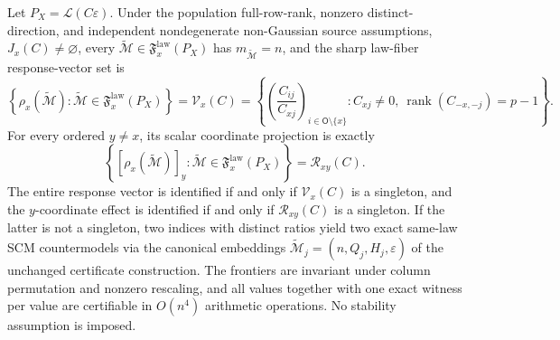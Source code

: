 Let \(P_X=\mathcal L(C\varepsilon)\). Under the population full-row-rank, nonzero distinct-direction, and independent nondegenerate non-Gaussian source assumptions, \(J_x(C)\ne\varnothing\), every \(\widetilde{\mathcal M}\in\mathfrak F_x^{\mathrm{law}}(P_X)\) has \(m_{\widetilde{\mathcal M}}=n\), and the sharp law-fiber response-vector set is
\[
 \left\{\rho_x(\widetilde{\mathcal M}):\widetilde{\mathcal M}\in\mathfrak F_x^{\mathrm{law}}(P_X)\right\}
 =\mathcal V_x(C)
 =\left\{\left(\frac{C_{ij}}{C_{xj}}\right)_{i\in\mathsf O\setminus\{x\}}:C_{xj}\ne0,\ \operatorname{rank}(C_{-x,-j})=p-1\right\}.
\]
For every ordered \(y\ne x\), its scalar coordinate projection is exactly
\[
 \left\{[\rho_x(\widetilde{\mathcal M})]_y:\widetilde{\mathcal M}\in\mathfrak F_x^{\mathrm{law}}(P_X)\right\}
 =\mathcal R_{xy}(C).
\]
The entire response vector is identified if and only if \(\mathcal V_x(C)\) is a singleton, and the \(y\)-coordinate effect is identified if and only if \(\mathcal R_{xy}(C)\) is a singleton. If the latter is not a singleton, two indices with distinct ratios yield two exact same-law SCM countermodels via the canonical embeddings \(\widetilde{\mathcal M}_j=(n,Q_j,H_j,\varepsilon)\) of the unchanged certificate construction. The frontiers are invariant under column permutation and nonzero rescaling, and all values together with one exact witness per value are certifiable in \(O(n^4)\) arithmetic operations. No stability assumption is imposed.